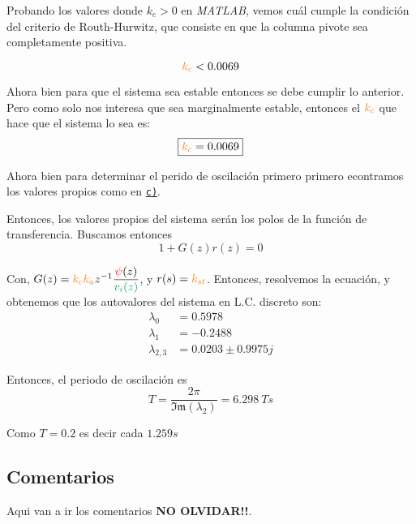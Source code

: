 Probando los valores donde \( k_c > 0 \) en \textit{MATLAB}, vemos cuál cumple la condición del criterio de Routh-Hurwitz, que consiste en que la columna pivote sea completamente positiva.

\begin{equation}
    \nara{k_{c}}  < 0.0069
\end{equation}

Ahora bien para que el sistema sea estable entonces se debe cumplir lo anterior. Pero 
como solo nos interesa que sea marginalmente estable, entonces el $\nara{k_{c}}$
que hace que el sistema lo sea es:
\begin{equation}
    \boxed{\nara{k_c} = 0.0069}
\end{equation}

Ahora bien para determinar el perido de oscilación primero primero econtramos los valores propios como en  \hyperref[pregunta-c]{\texttt{c)}}.

Entonces, los valores propios del sistema serán los polos de la función de
transferencia. Buscamos entonces
\begin{equation}
  1 + G(z)r(z) = 0
\end{equation}

Con, $G(z) =  \nara{k_{c} k_{a}} z^{-1} \dfrac{\rojo{\psi}(z)}{\verd{v_{i}(z)}}$, y
$r(s) = \nara{k_{st}}$. Entonces, resolvemos la ecuación, y obtenemos que los
autovalores del sistema en L.C. discreto son:
\begin{align*}
  \lambda_{0} &= 0.5978\\
  \lambda_{1} &= -0.2488\\
  \lambda_{2,3} &= 0.0203 \pm 0.9975j
\end{align*}

Entonces, el periodo de oscilación es
\begin{equation}
    T = \frac{2\pi}{\mathfrak{Im}(\lambda_{2})} = 6.298\ \unit{T s} 
\end{equation}

Como $T= 0.2$ es decir cada $1.259 \unit{s}$ 

\subsection{Comentarios}

Aqui van a ir los comentarios \textbf{NO OLVIDAR!!}.
